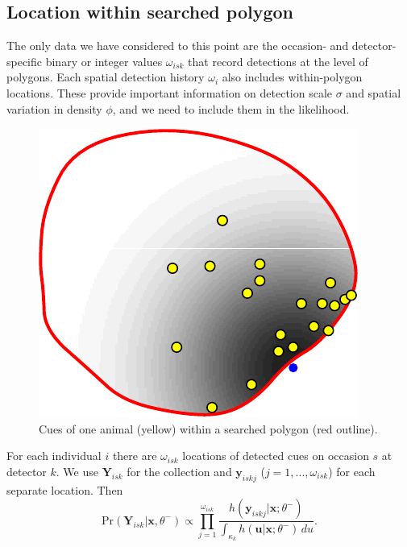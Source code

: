 \documentclass[
]{book}
\begin{document}
\subsection{Location within searched polygon}\label{location-within-searched-polygon}

The only data we have considered to this point are the occasion- and detector-specific binary or integer values \(\omega_{isk}\) that record detections at the level of polygons. Each spatial detection history \(\omega_i\) also includes within-polygon locations. These provide important information on detection scale \(\sigma\) and spatial variation in density \(\phi\), and we need to include them in the likelihood.

\begin{figure}

{\centering \includegraphics{SECRbook_files/figure-latex/overlapplot2-1} 

}

\caption{Cues of one animal (yellow) within a searched polygon (red outline).}\label{fig:overlapplot2}
\end{figure}

For each individual \(i\) there are \(\omega_{isk}\) locations of detected cues on occasion \(s\) at detector \(k\). We use \(\mathbf{Y}_{isk}\) for the collection and \(\mathbf{y}_{iskj}\) (\(j = 1,...,\omega_{isk}\)) for each separate location. Then
\begin{equation}
  \mbox{Pr}(\mathbf{Y}_{isk} | \mathbf{x}, \theta^-) \propto \prod_{j=1}^{\omega_{isk}} \frac{h(\mathbf{y}_{iskj} | \mathbf{x}; \theta^-)}{\int_{\kappa_k} h(\mathbf{u}|\mathbf{x}; \theta^-) \, du}.
  \label{eq:Yisk}
   \end{equation}
\end{document}

